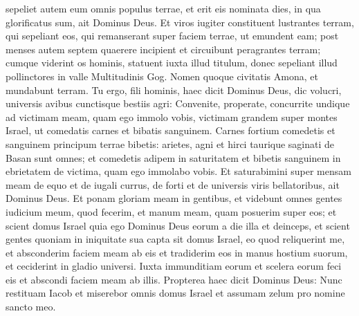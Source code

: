 \begin{biblechapter}
\begin{biblechapter}
\begin{biblechapter}
\begin{biblechapter}
\begin{biblechapter}
\begin{biblechapter}
\begin{biblechapter}
\begin{biblechapter}
\begin{biblechapter}
\begin{biblechapter}
\begin{biblechapter}
\begin{biblechapter}
\begin{biblechapter}
\begin{biblechapter}
\begin{biblechapter}
\begin{biblechapter}
\begin{biblechapter}
\begin{biblechapter}
\begin{biblechapter}
\begin{biblechapter}
\begin{biblechapter}
\begin{biblechapter}
\begin{biblechapter}
\begin{biblechapter}
\begin{biblechapter}
\begin{biblechapter}
\begin{biblechapter}
\begin{biblechapter}
\begin{biblechapter}
\begin{biblechapter}
\begin{biblechapter}
\begin{biblechapter}
\begin{biblechapter}
\begin{biblechapter}
\begin{biblechapter}
\begin{biblechapter}
\begin{biblechapter}
\begin{biblechapter}
\begin{biblechapter}
\verse sepeliet autem eum omnis populus terrae, et erit eis nominata dies, in qua glorificatus sum, ait Dominus Deus. 
\verse Et viros iugiter constituent lustrantes terram, qui sepeliant eos, qui remanserant super faciem terrae, ut emundent eam; post menses autem septem quaerere incipient 
\verse et circuibunt peragrantes terram; cumque viderint os hominis, statuent iuxta illud titulum, donec sepeliant illud pollinctores in valle Multitudinis Gog. 
\verse Nomen quoque civitatis Amona, et mundabunt terram.
 \verse Tu ergo, fili hominis, haec dicit Dominus Deus, dic volucri, universis avibus cunctisque bestiis agri: Convenite, properate, concurrite undique ad victimam meam, quam ego immolo vobis, victimam grandem super montes Israel, ut comedatis carnes et bibatis sanguinem. 
\verse Carnes fortium comedetis et sanguinem principum terrae bibetis: arietes, agni et hirci taurique saginati de Basan sunt omnes; 
\verse et comedetis adipem in saturitatem et bibetis sanguinem in ebrietatem de victima, quam ego immolabo vobis. 
\verse Et saturabimini super mensam meam de equo et de iugali currus, de forti et de universis viris bellatoribus, ait Dominus Deus.
 \verse Et ponam gloriam meam in gentibus, et videbunt omnes gentes iudicium meum, quod fecerim, et manum meam, quam posuerim super eos; 
\verse et scient domus Israel quia ego Dominus Deus eorum a die illa et deinceps, 
\verse et scient gentes quoniam in iniquitate sua capta sit domus Israel, eo quod reliquerint me, et absconderim faciem meam ab eis et tradiderim eos in manus hostium suorum, et ceciderint in gladio universi. 
\verse Iuxta immunditiam eorum et scelera eorum feci eis et abscondi faciem meam ab illis.
 \verse Propterea haec dicit Dominus Deus: Nunc restituam Iacob et miserebor omnis domus Israel et assumam zelum pro nomine sancto meo. 

\end{biblechapter}
\end{biblechapter}
\end{biblechapter}
\end{biblechapter}
\end{biblechapter}
\end{biblechapter}
\end{biblechapter}
\end{biblechapter}
\end{biblechapter}
\end{biblechapter}
\end{biblechapter}
\end{biblechapter}
\end{biblechapter}
\end{biblechapter}
\end{biblechapter}
\end{biblechapter}
\end{biblechapter}
\end{biblechapter}
\end{biblechapter}
\end{biblechapter}
\end{biblechapter}
\end{biblechapter}
\end{biblechapter}
\end{biblechapter}
\end{biblechapter}
\end{biblechapter}
\end{biblechapter}
\end{biblechapter}
\end{biblechapter}
\end{biblechapter}
\end{biblechapter}
\end{biblechapter}
\end{biblechapter}
\end{biblechapter}
\end{biblechapter}
\end{biblechapter}
\end{biblechapter}
\end{biblechapter}
\end{biblechapter}
